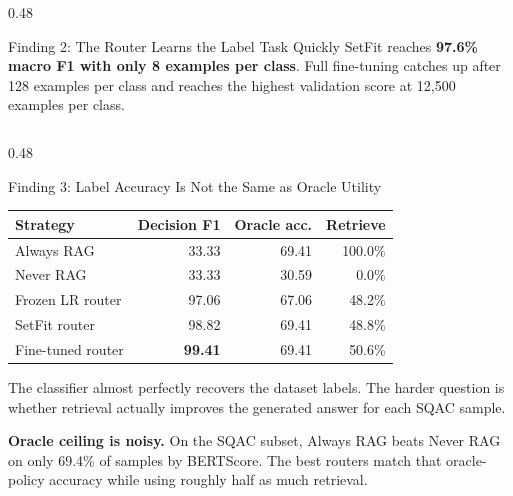 \documentclass[final]{beamer}
\begin{document}
\begin{frame}[t]
\begin{columns}[t]
\begin{column}{0.48\textwidth}
\begin{block}{Finding 2: The Router Learns the Label Task Quickly}
    \vspace{0.4em}
    \small SetFit reaches \textbf{97.6\% macro F1 with only 8 examples per class}.
    Full fine-tuning catches up after 128 examples per class and reaches the
    highest validation score at 12,500 examples per class.
  \end{block}
\end{column}

\end{columns}

\begin{columns}[t]

\begin{column}{0.48\textwidth}
  \begin{block}{Finding 3: Label Accuracy Is Not the Same as Oracle Utility}
    \small
    \begin{tabular}{lrrr}
      \toprule
      \textbf{Strategy} & \textbf{Decision F1} & \textbf{Oracle acc.} & \textbf{Retrieve} \\
      \midrule
      Always RAG & 33.33 & 69.41 & 100.0\% \\
      Never RAG & 33.33 & 30.59 & 0.0\% \\
      Frozen LR router & 97.06 & 67.06 & 48.2\% \\
      SetFit router & 98.82 & 69.41 & 48.8\% \\
      Fine-tuned router & \textbf{99.41} & 69.41 & 50.6\% \\
      \bottomrule
    \end{tabular}

    \vspace{0.5em}
    The classifier almost perfectly recovers the dataset labels. The harder
    question is whether retrieval actually improves the generated answer for
    each SQAC sample.

    \vspace{0.4em}
    \textbf{\color{accentorange}Oracle ceiling is noisy.}
    On the SQAC subset, Always RAG beats Never RAG on only 69.4\% of samples by
    BERTScore. The best routers match that oracle-policy accuracy while using
    roughly half as much retrieval.
  \end{block}
\end{column}


\end{columns}
\end{frame}
\end{document}

